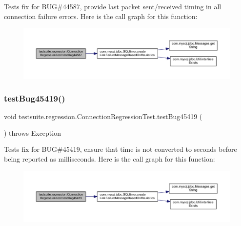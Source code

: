 Tests fix for B\+UG\#44587, provide last packet sent/received timing in all connection failure errors. Here is the call graph for this function\+:
\nopagebreak
\begin{figure}[H]
\begin{center}
\leavevmode
\includegraphics[width=350pt]{classtestsuite_1_1regression_1_1_connection_regression_test_af33f3215b2db8a83a5b3bb4079964dd3_cgraph}
\end{center}
\end{figure}
\mbox{\label{classtestsuite_1_1regression_1_1_connection_regression_test_a146f354cd24064670a0dae6971fb2a77}} 
\subsubsection{\texorpdfstring{test\+Bug45419()}{testBug45419()}}
{\footnotesize\ttfamily void testsuite.\+regression.\+Connection\+Regression\+Test.\+test\+Bug45419 (\begin{DoxyParamCaption}{ }\end{DoxyParamCaption}) throws Exception}

Tests fix for B\+UG\#45419, ensure that time is not converted to seconds before being reported as milliseconds. Here is the call graph for this function\+:
\nopagebreak
\begin{figure}[H]
\begin{center}
\leavevmode
\includegraphics[width=350pt]{classtestsuite_1_1regression_1_1_connection_regression_test_a146f354cd24064670a0dae6971fb2a77_cgraph}
\end{center}
\end{figure}
\mbox{\label{classtestsuite_1_1regression_1_1_connection_regression_test_a5b74dbc899a9fefe265aabac1e1818ce}} 
